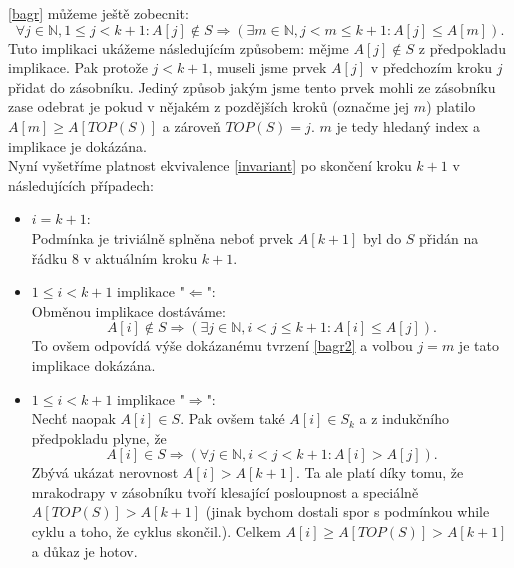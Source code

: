 \documentclass[12pt,a4paper]{article}
\theoremstyle{plain}
\newcommand{\N}{\mathbb{N}}
\begin{document}
\eqref{bagr} můžeme ještě zobecnit:
\begin{equation} \label{bagr2}
\forall j\in\N, 1 \leq j < k + 1: A[j] \not\in S \Rightarrow (\exists m \in \N, j < m \leq k + 1:  A[j] \leq A[m]).
\end{equation}
Tuto implikaci ukážeme následujícím způsobem: mějme $ A[j] \not\in S$ z předpokladu implikace. Pak protože $ j < k + 1 $, museli jsme prvek $ A[j] $ v předchozím kroku $ j $ přidat do zásobníku. Jediný způsob jakým jsme tento prvek mohli ze zásobníku zase odebrat je pokud v nějakém z pozdějších kroků (označme jej $ m $) platilo $ A[m] \geq A[TOP(S)]$ a zároveň $ TOP(S) = j $. $ m $ je tedy hledaný index a implikace je dokázána.\\



Nyní vyšetříme platnost ekvivalence \eqref{invariant} po skončení kroku $k+1$  v následujících případech:

\begin{itemize}
\item $i = k + 1$:\\
Podmínka je triviálně splněna neboť prvek $A[k+1]$ byl do $S$ přidán na řádku 8 v aktuálním kroku $k+1$.

\item $1 \leq i < k + 1$ implikace "$ \Leftarrow $":\\
Obměnou implikace dostáváme: 
\begin{equation} \label{alter}
A[i]\not\in S \Rightarrow (\exists j\in\N, i<j\leq k + 1: A[i] \leq A[j]).
\end{equation}
To ovšem odpovídá výše dokázanému tvrzení \eqref{bagr2} a volbou $ j = m $ je tato implikace dokázána.

\item $1 \leq i < k + 1$ implikace "$ \Rightarrow $":\\
Nechť naopak $ A[i] \in S $. Pak ovšem také $ A[i] \in S_k $ a z indukčního předpokladu plyne, že 
\begin{equation}
A[i]\in S \Rightarrow (\forall j\in\N, i < j < k + 1: A[i]>A[j]).
\end{equation}
Zbývá ukázat nerovnost $ A[i] > A[k + 1] $. Ta ale platí díky tomu, že mrakodrapy v zásobníku tvoří klesající posloupnost a speciálně $ A[TOP(S)] > A[k + 1] $ (jinak bychom dostali spor s podmínkou while cyklu a toho, že cyklus skončil.). Celkem $ A[i] \geq A[TOP(S)] > A[k + 1] $ a důkaz je hotov.

\end{itemize}
\end{document}

